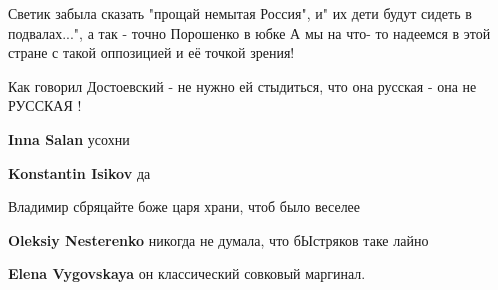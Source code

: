 \begin{itemize}
\begin{itemize}
Светик забыла сказать "прощай немытая Россия", и" их дети будут сидеть в
подвалах...", а так - точно Порошенко в юбке А мы на что- то надеемся в этой
стране с такой оппозицией и её точкой зрения!

 
Как говорил Достоевский - не нужно ей стыдиться, что она русская - она не РУССКАЯ !

 
\textbf{Inna Salan} усохни

 
\textbf{Konstantin Isikov} да

 
Владимир сбряцайте боже царя храни, чтоб было веселее

 
\textbf{Oleksiy Nesterenko} никогда не думала, что бЫстряков таке лайно

 
\textbf{Elena Vygovskaya} он классический совковый маргинал.

 

\end{itemize}
\end{itemize}
